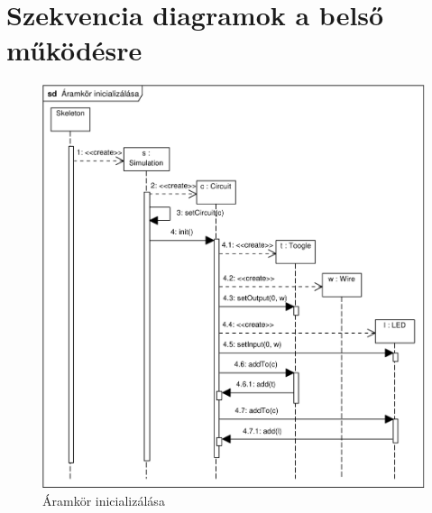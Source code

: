 \section{Szekvencia diagramok a belső működésre}

\begin{figure}[H]
\begin{center}
\includegraphics[width=17cm]{chapters/chapter05/imgs/init.pdf}
\caption{Áramkör inicializálása}
\label{fig:init}
\end{center}
\end{figure}

